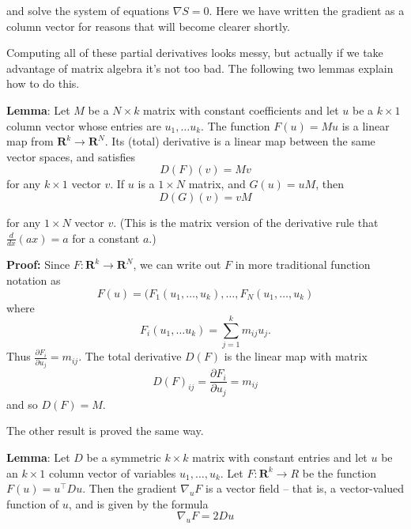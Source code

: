 \documentclass[
]{article}
\begin{document}
and solve the system of equations \(\nabla S=0\). Here we have written
the gradient as a column vector for reasons that will become clearer
shortly.

Computing all of these partial derivatives looks messy, but actually if
we take advantage of matrix algebra it's not too bad. The following two
lemmas explain how to do this.

\textbf{Lemma}: Let \(M\) be a \(N\times k\) matrix with constant
coefficients and let \(u\) be a \(k\times 1\) column vector whose
entries are \(u_1,\ldots u_{k}\). The function \(F(u) = Mu\) is a linear
map from \(\mathbf{R}^{k}\to\mathbf{R}^{N}\). Its (total) derivative is
a linear map between the same vector spaces, and satisfies \[
D(F)(v) = Mv
\] for any \(k\times 1\) vector \(v\). If \(u\) is a \(1\times N\)
matrix, and \(G(u) = uM\), then \[
D(G)(v) = vM
\]

for any \(1\times N\) vector \(v\). (This is the matrix version of the
derivative rule that \(\frac{d}{dx}(ax)=a\) for a constant \(a\).)

\textbf{Proof:} Since \(F:\mathbf{R}^{k}\to\mathbf{R}^{N}\), we can
write out \(F\) in more traditional function notation as \[
F(u) = (F_{1}(u_1,\ldots, u_k), \ldots, F_{N}(u_1,\ldots, u_{k})
\] where \[
F_{i}(u_1,\ldots u_k) = \sum_{j=1}^{k} m_{ij}u_{j}.
\] Thus \(\frac{\partial F_{i}}{\partial u_{j}} = m_{ij}\). The total
derivative \(D(F)\) is the linear map with matrix \[
D(F)_{ij} = \frac{\partial F_{i}}{\partial u_{j}} = m_{ij}
\] and so \(D(F)=M\).

The other result is proved the same way.

\textbf{Lemma}: Let \(D\) be a symmetric \(k\times k\) matrix with
constant entries and let \(u\) be an \(k\times 1\) column vector of
variables \(u_{1},\ldots, u_{k}\). Let \(F:\mathbf{R}^{k}\to R\) be the
function \(F(u) = u^{\intercal}Du\). Then the gradient \(\nabla_{u} F\)
is a vector field -- that is, a vector-valued function of \(u\), and is
given by the formula \[
\nabla_{u} F = 2Du
\]
\end{document}

